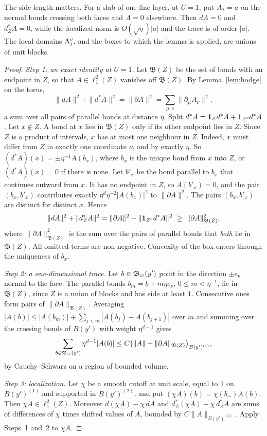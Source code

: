 The side length matters. For a slab of one fine layer, at $U=1$, put $A_1=a$ on the normal bonds crossing both faces and $A=0$ elsewhere. Then $dA=0$ and $d^*_ZA=0$, while the localized norm is $O(\sqrt\eta)|a|$ and the trace is of order $|a|$. The local domains $\Lambda^v_j$, and the boxes to which the lemma is applied, are unions of unit blocks.

\begin{proof}
\emph{Step 1: an exact identity at $U=1$.} Let $\mathfrak B(Z)$ be the set of bonds with an endpoint in $Z$, so that $A\in\ell^2_1(Z)$ vanishes off $\mathfrak B(Z)$. By Lemma~\ref{lem:hodge} on the torus,
\[
\|dA\|^2+\|d^*A\|^2=\|\partial A\|^2=\sum_{\mu,\nu}\|\partial_\mu A_\nu\|^2,
\]
a sum over all pairs of parallel bonds at distance $\eta$. Split $d^*A=\mathbf 1_Zd^*A+\mathbf 1_{Z^c}d^*A$. Let $x\notin Z$. A bond at $x$ lies in $\mathfrak B(Z)$ only if its other endpoint lies in $Z$. Since $Z$ is a product of intervals, $x$ has at most one neighbour in $Z$. Indeed, $x$ must differ from $Z$ in exactly one coordinate $\nu$, and by exactly $\eta$. So $(d^*A)(x)=\pm\eta^{-1}A(b_x)$, where $b_x$ is the unique bond from $x$ into $Z$, or $(d^*A)(x)=0$ if there is none. Let $b'_x$ be the bond parallel to $b_x$ that continues outward from $x$. It has no endpoint in $Z$, so $A(b'_x)=0$, and the pair $(b_x,b'_x)$ contributes exactly $\eta^d\eta^{-2}|A(b_x)|^2$ to $\|\partial A\|^2$. The pairs $(b_x,b'_x)$ are distinct for distinct $x$. Hence
\[
\|dA\|^2+\|d^*_ZA\|^2=\|\partial A\|^2-\|\mathbf 1_{Z^c}d^*A\|^2\ \ge\ \|\partial A\|^2_{\mathfrak B(Z)},
\]
where $\|\partial A\|^2_{\mathfrak B(Z)}$ is the sum over the pairs of parallel bonds that \emph{both} lie in $\mathfrak B(Z)$. All omitted terms are non-negative. Convexity of the box enters through the uniqueness of $b_x$.

\emph{Step 2: a one-dimensional trace.} Let $b\in\mathfrak B_{\rm cr}(y')$ point in the direction $\pm e_\nu$ normal to the face. The parallel bonds $b_m=b\mp m\eta e_\nu$, $0\le m<\eta^{-1}$, lie in $\mathfrak B(Z)$, since $Z$ is a union of blocks and has side at least $1$. Consecutive ones form pairs of $\|\partial A\|_{\mathfrak B(Z)}$. Averaging $|A(b)|\le|A(b_m)|+\sum_{j<m}|A(b_j)-A(b_{j+1})|$ over $m$ and summing over the crossing bonds of $B(y')$ with weight $\eta^{d-1}$ gives
\[
\sum_{b\in\mathfrak B_{\rm cr}(y')}\eta^{d-1}|A(b)|\le C\big(\|A\|+\|\partial A\|_{\mathfrak B(Z)}\big)_{B(y')^{(1)}},
\]
by Cauchy--Schwarz on a region of bounded volume.

\emph{Step 3: localization.} Let $\chi$ be a smooth cutoff at unit scale, equal to $1$ on $B(y')^{(1)}$ and supported in $B(y')^{(2)}$, and put $(\chi A)(b)=\chi(b_-)A(b)$. Then $\chi A\in\ell^2_1(Z)$. Moreover $d(\chi A)-\chi\,dA$ and $d^*_Z(\chi A)-\chi\,d^*_ZA$ are sums of differences of $\chi$ times shifted values of $A$, bounded by $C\|A\|_{B(y')^{(2)}}$. Apply Steps~1 and~2 to $\chi A$.


\end{proof}
